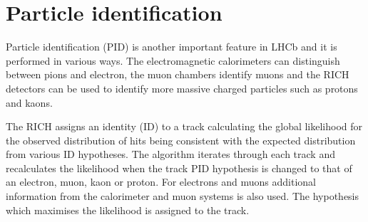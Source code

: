 \section{Particle identification}
\label{sec:PID_perf}

Particle identification (PID) is another important feature in LHCb and it is performed in various ways.
The electromagnetic calorimeters can distinguish between pions and electron, the muon chambers
identify muons and the RICH detectors can be used to identify 
more massive charged particles such as protons and kaons.

The RICH assigns an identity (ID) to a track calculating the global likelihood for the observed distribution 
of hits being consistent with the expected distribution from various ID hypotheses.
The algorithm iterates through each track and recalculates the likelihood when the track PID hypothesis
is changed to that of an electron, muon, kaon or proton. For electrons and muons additional information
from the calorimeter and muon systems is also used. The hypothesis which maximises the likelihood
is assigned to the track.

